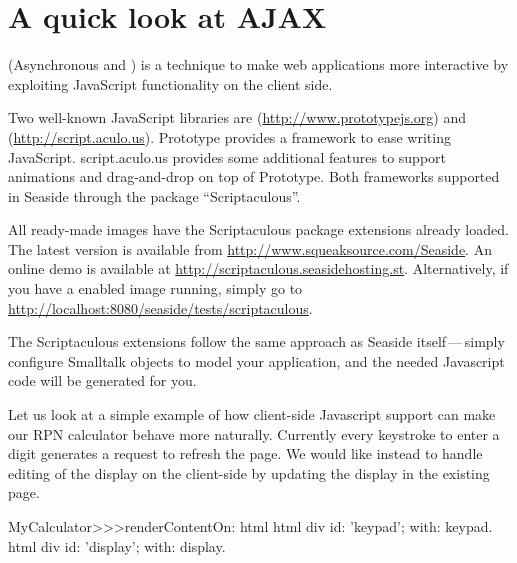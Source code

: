 \documentclass[a4paper,10pt,twoside]{book}
\begin{document}
\section{A quick look at AJAX}


 (Asynchronous  and ) is a technique to make web applications more interactive by exploiting JavaScript functionality on the client side.

Two well-known JavaScript libraries are  (\url{http://www.prototypejs.org}) and  (\url{http://script.aculo.us}).
Prototype provides a framework to ease writing JavaScript.
script.aculo.us provides some additional features to support animations and drag-and-drop on top of Prototype.
Both frameworks  supported in Seaside through the package ``Scriptaculous''.

All ready-made images have the Scriptaculous package extensions already loaded.
The latest version is available from \url{http://www.squeaksource.com/Seaside}.
An online demo is available at \url{http://scriptaculous.seasidehosting.st}.
Alternatively, if you have a enabled image running, simply go to \url{http://localhost:8080/seaside/tests/scriptaculous}.

The Scriptaculous extensions follow the same approach as Seaside itself\,---\,simply configure Smalltalk objects to model your application, and the needed Javascript code will be generated for you.

Let us look at a simple example of how client-side Javascript support can make our RPN calculator behave more naturally.
Currently every keystroke to enter a digit generates a request to refresh the page.
We would like instead to handle editing of the display on the client-side by updating the display in the existing page.


\begin{code}{}
MyCalculator>>>renderContentOn: html
	html div id: 'keypad'; with: keypad.
	html div id: 'display'; with: display.	
\end{code}
				
\end{document}
